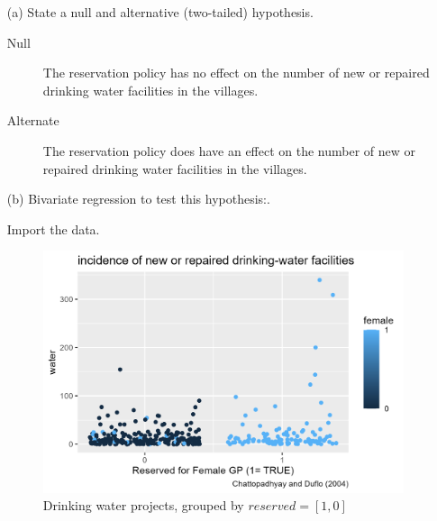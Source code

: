 \documentclass[12pt,letterpaper]{article}
\begin{document}
\newpage
\begin{enumerate}
	\item [(a)] State a null and alternative (two-tailed) hypothesis. 
	
	\begin{description}
	  \item [Null] The reservation policy has no effect on the number of new or 
	  repaired drinking water facilities in the villages.
	  \item [Alternate] The reservation policy does have an effect on the number of new or 
	  repaired drinking water facilities in the villages.
	\end{description}
	

	
	\item [(b)] Bivariate regression to test this hypothesis:.

  Import the data.

	  
	
  \begin{figure}[htb!]
	\caption{\footnotesize{Drinking water projects, grouped by $reserved = [1,0]$}}
	\vspace{.5cm}
	\centering
	\label{fig:water_reserved}
	\includegraphics[width=1.0\textwidth]{graphics/resrvd_water.png}
  \end{figure}		
	

\end{enumerate}
\end{document}
